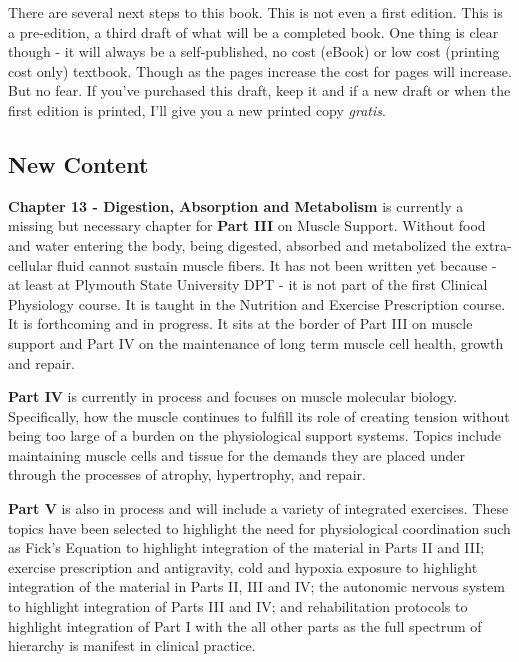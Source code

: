 
There are several next steps to this book. This is not even a first edition. This is a pre-edition, a third draft of what will be a completed book. One thing is clear though - it will always be a self-published, no cost (eBook) or low cost (printing cost only) textbook. Though as the pages increase the cost for pages will increase. But no fear. If you've purchased this draft, keep it and if a new draft or when the first edition is printed, I'll give you a new printed copy \textit{gratis}. 

\subsection*{New Content}

\textbf{Chapter 13 - Digestion, Absorption and Metabolism} is currently a missing but necessary chapter for \textbf{Part III} on Muscle Support. Without food and water entering the body, being digested, absorbed and metabolized the extra-cellular fluid cannot sustain muscle fibers. It has not been written yet because - at least at Plymouth State University DPT - it is not part of the first Clinical Physiology course. It is taught in the Nutrition and Exercise Prescription course. It is forthcoming and in progress. It sits at the border of Part III on muscle support and Part IV on the maintenance of long term muscle cell health, growth and repair.

\textbf{Part IV} is currently in process and focuses on muscle molecular biology. Specifically, how the muscle continues to fulfill its role of creating tension without being too large of a burden on the physiological support systems. Topics include maintaining muscle cells and tissue for the demands they are placed under through the processes of atrophy, hypertrophy, and repair. 

\textbf{Part V} is also in process and will include a variety of integrated exercises. These topics have been selected to highlight the need for physiological coordination such as Fick's Equation to highlight integration of the material in Parts II and III; exercise prescription and antigravity, cold and hypoxia exposure to highlight integration of the material in Parts II, III and IV; the autonomic nervous system to highlight integration of Parts III and IV; and rehabilitation protocols to highlight integration of Part I with the all other parts as the full spectrum of hierarchy is manifest in clinical practice.


